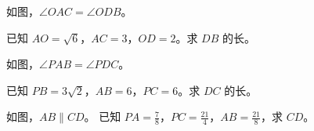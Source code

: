 \documentclass{exam-zh}
\begin{document}

\begin{problem}[points=10]
  \noindent
  \begin{minipage}[t]{\dimexpr\linewidth-60mm-6mm\relax}
    \vspace{0pt}
    如图，$\angle OAC=\angle ODB$。

已知 $AO=\sqrt{6}$，$AC=3$，$OD=2$。求 $DB$ 的长。
    
  \end{minipage}\hfill
  \begin{diagramcoltikz}{60mm}{}
  }
  \end{diagramcoltikz}
  \par\medskip
  \answerarea[54mm]
\end{problem}



\begin{problem}[points=10]
  \noindent
  \begin{minipage}[t]{\dimexpr\linewidth-60mm-6mm\relax}
    \vspace{0pt}
    如图，$\angle PAB=\angle PDC$。

已知 $PB=3\sqrt{2}$，$AB=6$，$PC=6$。求 $DC$ 的长。
    
  \end{minipage}\hfill
  \begin{diagramcoltikz}{60mm}{}
  }
  \end{diagramcoltikz}
  \par\medskip
  \answerarea[54mm]
\end{problem}



\begin{problem}[points=10]
  \noindent
  \begin{minipage}[t]{\dimexpr\linewidth-60mm-6mm\relax}
    \vspace{0pt}
    如图，$AB\parallel CD$。
已知 $PA=\frac{7}{8}$，$PC=\frac{21}{4}$，$AB=\frac{21}{8}$，求 $CD$。
    
  \end{minipage}\hfill
  \begin{diagramcoltikz}{60mm}{}
  }
  \end{diagramcoltikz}
  \par\medskip
  \answerarea[42mm]
\end{problem}
\end{document}
